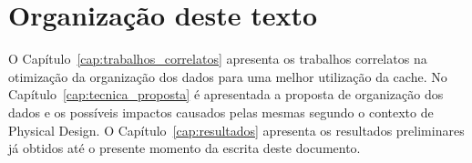 %

\section{Organização deste texto}

O Capítulo~\ref{cap:trabalhos_correlatos} apresenta os trabalhos correlatos na otimização da organização dos dados para uma melhor utilização da cache.
No Capítulo~\ref{cap:tecnica_proposta} é apresentada a proposta de organização dos dados e os possíveis impactos causados pelas mesmas segundo o contexto de Physical Design.
O Capítulo~\ref{cap:resultados} apresenta os resultados preliminares já obtidos até o presente momento da escrita deste documento.
